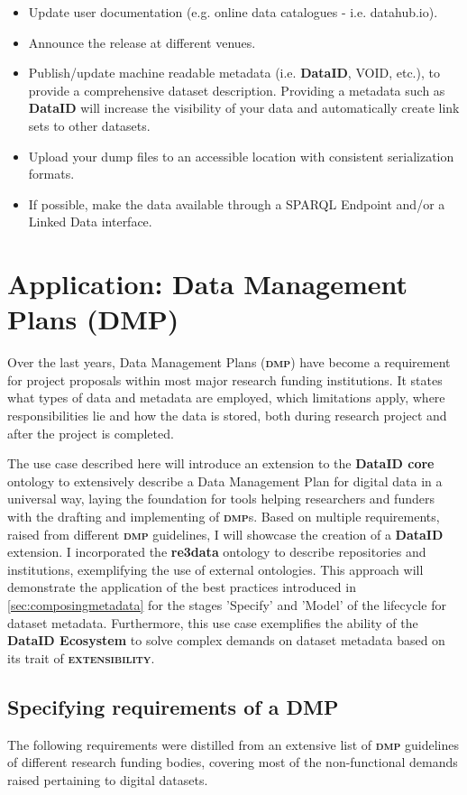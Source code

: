 \documentclass[a4paper,english,twoside,BCOR1.5cm,headsepline,DIV12,appendixprefix,final,12pt]{scrbook}
\newcommand{\extensibility}{{\ttfamily\scshape\bfseries extensibility}\xspace}
\newcommand{\ecosystem}{{\ttfamily\bfseries DataID Ecosystem}\xspace}
\newcommand{\dataid}{{\ttfamily\bfseries DataID}\xspace}
\newcommand{\core}{{\ttfamily\bfseries DataID core}\xspace}
\newcommand{\dmp}{{\scshape\bfseries dmp}\xspace}
\newcommand{\redata}{{\ttfamily\bfseries re3data}\xspace}
\begin{document}
\begin{itemize}
\itemsep0em 
\item Update user documentation (e.g. online data catalogues - i.e. datahub.io).
\item Announce the release at different venues. 
\item Publish/update machine readable metadata (i.e. \dataid, VOID, etc.), to provide a comprehensive dataset description. Providing a metadata such as \dataid will increase the visibility of your data and automatically create link sets to other datasets.
\item Upload your dump files to an accessible location with consistent serialization formats.
\item If possible, make the data available through a SPARQL Endpoint and/or a Linked Data interface.
\end{itemize}


\chapter{Application: Data Management Plans (DMP)}
\label{chap:dmp}
Over the last years, Data Management Plans (\dmp) have become a requirement for project proposals within most major research funding institutions. It states what types of data and metadata are employed, which limitations apply, where responsibilities lie and how the data is stored, both during research project and after the project is completed. 

The use case described here will introduce an extension to the \core ontology to extensively describe a Data Management Plan for digital data in a universal way, laying the foundation for tools helping researchers and funders with the drafting and implementing of \dmp{}s.
Based on multiple requirements, raised from different \dmp guidelines, I will showcase the creation of a \dataid extension. I incorporated the \redata ontology to describe repositories and institutions, exemplifying the use of external ontologies. This approach will demonstrate the application of the best practices introduced in \cref{sec:composingmetadata} for the stages 'Specify' and 'Model' of the lifecycle for dataset metadata. Furthermore, this use case exemplifies the ability of the \ecosystem to solve complex demands on dataset metadata based on its trait of \extensibility.

\section{Specifying requirements of a DMP} 
\label{sec:dmprequ}
The following requirements were distilled from an extensive list of \dmp guidelines of different research funding bodies, covering most of the non-functional demands raised pertaining to digital datasets. 
\end{document}
